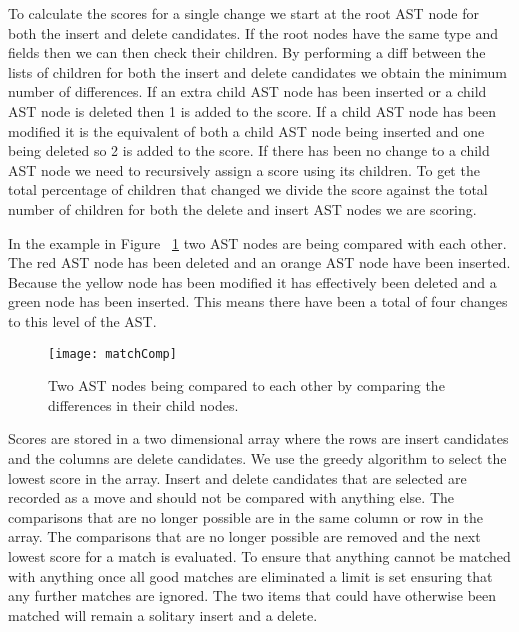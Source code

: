 % 

To calculate the scores for a single change we start at the root AST node for both the insert and delete candidates.  
If the root nodes have the same type and fields then we can then check their children. 
By performing a diff between the lists of children for both the insert and delete candidates we obtain the minimum number of differences.  
If an extra child AST node has been inserted or a child AST node is deleted then 1 is added to the score. 
If a child AST node has been modified it is the equivalent of both a child AST node being inserted and one being deleted so 2 is added to the score. 
If there has been no change to a child AST node we need to recursively assign a score using its children. 
To get the total percentage of children that changed we divide the score against the total number of children for both the delete and insert AST nodes we are scoring.

In the example in Figure ~\ref{fig:matchComp} two AST nodes are being compared with each other. The red AST node has been deleted and an orange AST node have been inserted. Because the yellow node has been modified it has effectively been deleted and a green node has been inserted. This means there have been a total of four changes to this level of the AST. 

\begin{figure}[!t]
 \begin{center}
 \texttt{[image: matchComp]}
 \end{center}
 \caption{Two AST nodes being compared to each other by comparing the differences in their child nodes.}
 \label{fig:matchComp}
\end{figure}

Scores are stored in a two dimensional array where the rows are insert candidates and the columns are delete candidates.  
We use the greedy algorithm to select the lowest score in the array.  
Insert and delete candidates that are selected are recorded as a move and should not be compared with anything else. 
The comparisons that are no longer possible are in the same column or row in the array.  
The comparisons that are no longer possible are removed and the next lowest score for a match is evaluated.  
To ensure that anything cannot be matched with anything once all good matches are eliminated a limit is set ensuring that any further matches are ignored.  
The two items that could have otherwise been matched will remain a solitary insert and a delete.

